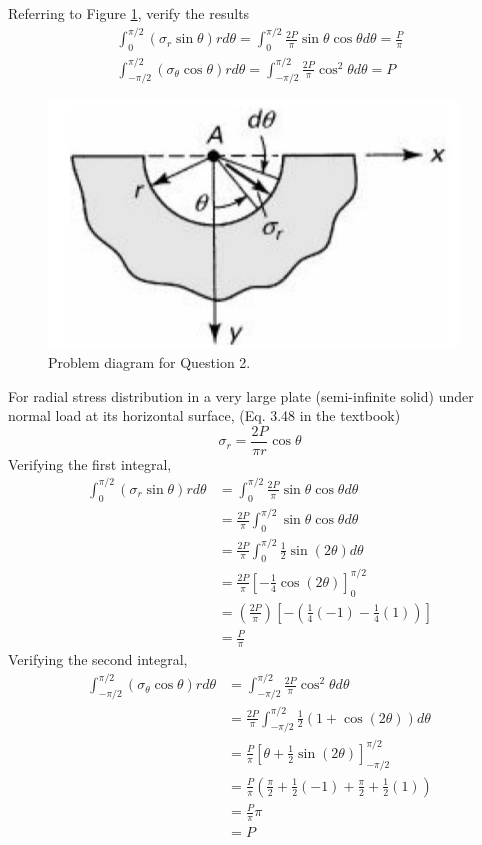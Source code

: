 \section{}
Referring to Figure \ref{fig:Q2ProblemDiagram}, verify the results 
\begin{align*}
    \int_{0}^{\pi/2} (\sigma_r \sin\theta) r d\theta = \int_{0}^{\pi/2} \frac{2P}{\pi} \sin\theta \cos\theta d\theta = \frac{P}{\pi} \\
    \int_{-\pi/2}^{\pi/2} (\sigma_\theta \cos\theta) r d\theta = \int_{-\pi/2}^{\pi/2}\frac{2P}{\pi} \cos^2\theta d\theta = P 
\end{align*}
\begin{figure}[h]
    \centering
    \includegraphics[width=0.35\linewidth]{Questions/Figures/Q2ProblemDiagram.png}
    \caption{Problem diagram for Question 2.}
    \label{fig:Q2ProblemDiagram}
\end{figure}

For radial stress distribution in a very large plate (semi-infinite solid) under normal load at its horizontal surface,
(Eq. 3.48 in the textbook)
\begin{equation*}
    \sigma_r = \frac{2P}{\pi r} \cos\theta
\end{equation*}
Verifying the first integral,
\begin{align*}
    \int_{0}^{\pi/2} (\sigma_r \sin\theta) r d\theta &= \int_{0}^{\pi/2} \frac{2P}{\pi} \sin\theta \cos\theta d\theta \\
    &= \frac{2P}{\pi} \int_{0}^{\pi/2} \sin\theta \cos\theta d\theta \\
    &= \frac{2P}{\pi} \int_{0}^{\pi/2} \frac{1}{2} \sin(2\theta) d\theta \\
    &=\frac{2P}{\pi} \left[-\frac{1}{4} \cos(2\theta) \right]_{0}^{\pi/2} \\
    &= \left(\frac{2P}{\pi}\right) \left[-\left(\frac{1}{4} (-1) - \frac{1}{4} (1) \right)\right] \\
    &= \boxed{\frac{P}{\pi}}
\end{align*}
Verifying the second integral,
\begin{align*}
    \int_{-\pi/2}^{\pi/2} (\sigma_\theta \cos\theta) r d\theta &= \int_{-\pi/2}^{\pi/2}\frac{2P}{\pi} \cos^2\theta d\theta \\
    &= \frac{2P}{\pi} \int_{-\pi/2}^{\pi/2} \frac{1}{2} (1 + \cos(2\theta)) d\theta \\
    &= \frac{P}{\pi} \left[\theta + \frac{1}{2} \sin(2\theta) \right]_{-\pi/2}^{\pi/2} \\
    &= \frac{P}{\pi} \left(\frac{\pi}{2} + \frac{1}{2} (-1) + \frac{\pi}{2} + \frac{1}{2} (1) \right) \\
    &= \frac{P}{\pi} \pi \\
    &= \boxed{P}
\end{align*}